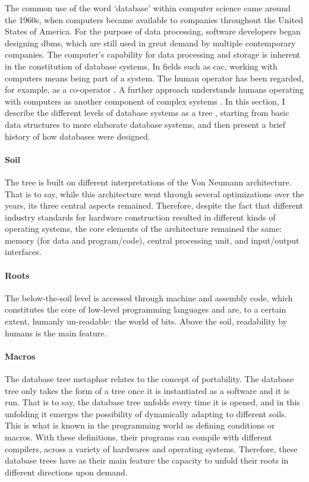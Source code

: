 The common use of the word `database' within computer science came around the 1960s, when computers became available to companies throughout the United States of America. For the purpose of data processing, software developers began designing \gls{dbms}, which are still used in great demand by multiple contemporary companies. The computer's capability for data processing and storage is inherent in the constitution of database systems. In fields such as \gls{cac}, working with computers means being part of a system. The human operator has been regarded, for example, as a co-operator \parencite{Mat63:The}. A further approach understands humans operating with computers as another component of complex systems \parencite{Vag01:Som}. In this section, I describe the different levels of database systems as a tree , starting from basic data structures to more elaborate database systems, and then present a brief history of how databases were designed.


\paragraph{Soil}
The tree is built on different interpretations of the Von Neumann architecture. That is to say, while this architecture went through several optimizations over the years, its three central aspects remained. Therefore, despite the fact that different industry standards for hardware construction resulted in different kinds of operating systems, the core elements of the architecture remained the same: memory (for data and program/code), central processing unit, and input/output interfaces.

\paragraph{Roots}
The below-the-soil level is accessed through machine and assembly code, which constitutes the core of low-level programming languages and are, to a certain extent, humanly un-readable: the world of bits. Above the soil, readability by humans is the main feature.

\paragraph{Macros}
\label{portability}
The database tree metaphor relates to the concept of portability. The database tree only takes the form of a tree once it is instantiated as a software and it is run. That is to say, the database tree unfolds every time it is opened, and in this unfolding it emerges the possibility of dynamically adapting to different soils. This is what is known in the programming world as defining conditions or macros. With these definitions, their programs can compile with different compilers, across a variety of hardwares and operating systems. Therefore, these database trees have as their main feature the capacity to unfold their roots in different directions upon demand. 

